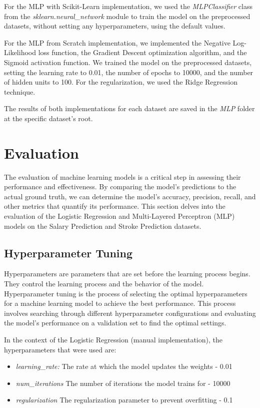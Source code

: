 \documentclass[runningheads]{paper}
\begin{document}
For the MLP with Scikit-Learn implementation, we used the \textit{MLPClassifier} class
from the \textit{sklearn.neural\_network} module to train the model on the preprocessed
datasets, without setting any hyperparameters, using the default values.

For the MLP from Scratch implementation, we implemented the Negative Log-Likelihood loss
function, the Gradient Descent optimization algorithm, and the Sigmoid activation function.
We trained the model on the preprocessed datasets, setting the learning rate to 0.01, the
number of epochs to 10000, and the number of hidden units to 100. For the regularization,
we used the Ridge Regression technique.

The results of both implementations for each dataset are saved in the \textit{MLP}
folder at the specific dataset's root.



\section{Evaluation}
The evaluation of machine learning models is a critical step in assessing their
performance and effectiveness. By comparing the model's predictions to the actual
ground truth, we can determine the model's accuracy, precision, recall, and other
metrics that quantify its performance. This section delves into the evaluation
of the Logistic Regression and Multi-Layered Perceptron (MLP) models on the
Salary Prediction and Stroke Prediction datasets.

\subsection{Hyperparameter Tuning}
Hyperparameters are parameters that are set before the learning process begins.
They control the learning process and the behavior of the model. Hyperparameter
tuning is the process of selecting the optimal hyperparameters for a machine
learning model to achieve the best performance. This process involves searching
through different hyperparameter configurations and evaluating the model's
performance on a validation set to find the optimal settings.

In the context of the Logistic Regression (manual implementation), the 
hyperparameters that were used are:

\begin{itemize}
    \item \textit{learning\_rate:} The rate at which the model updates the weights - 0.01
    \item \textit{num\_iterations} The number of iterations the model trains for - 10000
    \item \textit{regularization} The regularization parameter to prevent overfitting - 0.1
\end{itemize}
\end{document}

